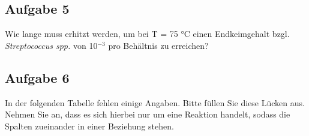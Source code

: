 \documentclass[a4paper,11pt]{article}
\newif\ifshowme
\begin{document}
 

\subsection*{Aufgabe 5}
Wie lange muss erhitzt werden, um bei T = 75 °C einen Endkeimgehalt bzgl.
\textit{Streptococcus spp.} von 10$^{-3}$ pro Behältnis zu erreichen?
\par 
{}

\pp

\ifshowme
\antwort{
D-Wert der neuen Temperatur ausrechnen:
\begin{align*}
D_1 &= D_2 \cdot 10^{\frac{T_2-T_1}{z}} \\
D_1 &= 0,5 ~\text{min}  \cdot 10^{\frac{80-75}{8,5}} \\
	&= 1,94
\end{align*}


Anfangskeimgehalt einer 450 g-Konserve: 
\begin{align*}
10^2 \cdot 450 = 45.000 
\end{align*} 
Zeit die nötig ist, um auf 10$^{-3}$ Sporen pro Behältnis zu reduzieren:
\begin{align*}
\text{Heating Time} &= D_T \cdot \log(\frac{N_0}{N}) \\
\text{Heating Time} &= 1,94 \cdot \log(\frac{45.000}{10^{-3}}) \\
 &= 14,85 ~ \text{min}
\end{align*}

}
\else
\fi



\subsection*{Aufgabe 6}
In der folgenden Tabelle fehlen einige Angaben. Bitte füllen Sie diese Lücken aus. Nehmen Sie an, dass es sich hierbei nur um eine Reaktion handelt, sodass die Spalten
zueinander in einer Beziehung stehen. \par 
\end{document}
